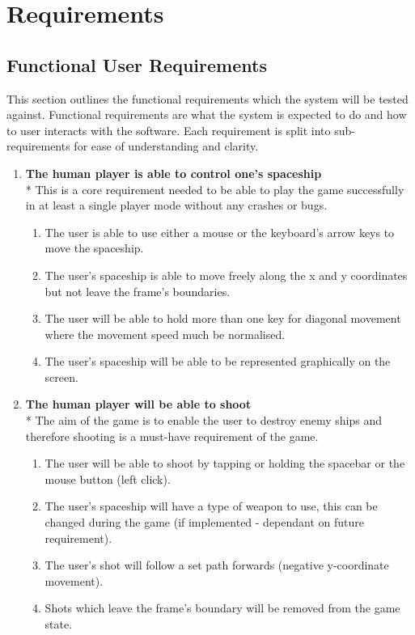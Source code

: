 \chapter{Requirements}
\label{cha:requirements}
\section{Functional User Requirements}
\label{sec: functional}

This section outlines the functional requirements which the system will be tested against. Functional requirements are what the system is expected to do and how to user interacts with the software. Each requirement is split into sub-requirements for ease of understanding and clarity.

\begin{enumerate}
\item \textbf{The human player is able to control one's spaceship}
\\* This is a core requirement needed to be able to play the game successfully in at least a single player mode without any crashes or bugs.
\begin{enumerate}
\item The user is able to use either a mouse or the keyboard's arrow keys to move the spaceship.
\item The user's spaceship is able to move freely along the x and y coordinates but not leave the frame's boundaries.
\item The user will be able to hold more than one key for diagonal movement where the movement speed much be normalised.
\item The user's spaceship will be able to be represented graphically on the screen.
\end{enumerate}

\item \textbf{The human player will be able to shoot}
\\* The aim of the game is to enable the user to destroy enemy ships and therefore shooting is a must-have requirement of the game.
\begin{enumerate}
\item The user will be able to shoot by tapping or holding the spacebar or the mouse button (left click).
\item The user's spaceship will have a type of weapon to use, this can be changed during the game (if implemented - dependant on future requirement).
\item The user's shot will follow a set path forwards (negative y-coordinate movement).
\item Shots which leave the frame's boundary will be removed from the game state.
\end{enumerate}


\end{enumerate}
